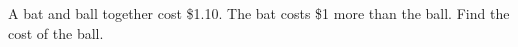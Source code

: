 A bat and ball together cost \$1.10. The bat costs \$1 more than the ball. Find the cost of the ball.
